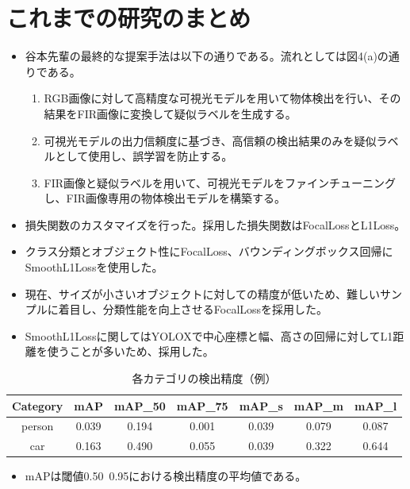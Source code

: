 \documentclass[a4j]{jarticle}
\begin{document}
	\section{これまでの研究のまとめ}
	\begin{itemize}
		\item 谷本先輩の最終的な提案手法は以下の通りである。流れとしては図4(a)の通りである。
		\begin{enumerate}
			\item RGB画像に対して高精度な可視光モデルを用いて物体検出を行い、その結果をFIR画像に変換して疑似ラベルを生成する。
			\item 可視光モデルの出力信頼度に基づき、高信頼の検出結果のみを疑似ラベルとして使用し、誤学習を防止する。
			\item FIR画像と疑似ラベルを用いて、可視光モデルをファインチューニングし、FIR画像専用の物体検出モデルを構築する。
		\end{enumerate}
	\end{itemize}
	\begin{itemize}
		\item 損失関数のカスタマイズを行った。採用した損失関数はFocalLossとL1Loss。
		\item クラス分類とオブジェクト性にFocalLoss、バウンディングボックス回帰にSmoothL1Lossを使用した。
		\item 現在、サイズが小さいオブジェクトに対しての精度が低いため、難しいサンプルに着目し、分類性能を向上させるFocalLossを採用した。
		\item SmoothL1Lossに関してはYOLOXで中心座標と幅、高さの回帰に対してL1距離を使うことが多いため、採用した。
	\end{itemize}
	\begin{table}[htbp]
		\centering
		\begin{tabular}{|c|c|c|c|c|c|c|}
			\hline
			\textbf{Category} & \textbf{mAP} & \textbf{mAP\_50} & \textbf{mAP\_75} & \textbf{mAP\_s} & \textbf{mAP\_m} & \textbf{mAP\_l} \\
			\hline
			person & 0.039 & 0.194 & 0.001 & 0.039 & 0.079 & 0.087 \\
			car    & 0.163 & 0.490 & 0.055 & 0.039 & 0.322 & 0.644 \\
			\hline
		\end{tabular}
		\caption{各カテゴリの検出精度（例）}
	\end{table}
	\begin{itemize}
		\item mAPは閾値0.50~0.95における検出精度の平均値である。
	\end{itemize}
\end{document}
